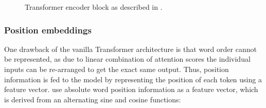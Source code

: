 \documentclass[letterpaper, 12pt]{report}
\begin{document}
\begin{figure}
  \centering
  \caption{Transformer encoder block as described in \citet{vaswani2017}.}
  \label{fig:bg_transformer}
\end{figure}

\subsubsection{Position embeddings}
\label{sec:bg_position_embeddings}

One drawback of the vanilla Transformer architecture is that word order cannot be represented, as due to linear combination of attention scores the individual inputs can be re-arranged to get the exact same output. Thus, position information is fed to the model by representing the position of each token using a feature vector. \citet{vaswani2017} use absolute word position information as a feature vector, which is derived from an alternating sine and cosine functions:
\end{document}
